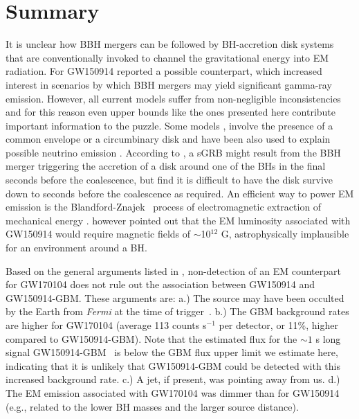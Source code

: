 \documentclass{aastex61}
\begin{document}
\section{Summary}

It is unclear how BBH mergers can be followed by BH-accretion disk systems that are conventionally invoked \citep[e.g.][]{2014ARA&A..52...43B} to channel the gravitational energy into EM radiation. For GW150914 \citet{Connaughton16} reported a possible counterpart, which increased interest in scenarios by which BBH mergers may yield significant gamma-ray emission. However, all current models suffer from non-negligible inconsistencies \citep[e.g.][]{Lyutikov16} and for this reason even upper bounds like the ones presented here contribute important information to the puzzle. Some models \citep{Loeb16,Woosley16}, involve the presence of a common envelope or a circumbinary disk and have been also used to explain possible neutrino emission \citep{Janiuk17,2016PhRvD..93l3011M}. According to \citet{Perna16}, a sGRB might result from the BBH merger triggering the accretion of a disk around one of the BHs in the final seconds before the coalescence, but \citet{Kimura17} find it is difficult to have the disk survive down to seconds before the coalescence as required. An efficient way to power EM emission is the Blandford-Znajek~\citep{Blandford77} process of electromagnetic extraction of mechanical energy \citep{Li16,Veres16}. \citet{Lyutikov16} however pointed out that the EM luminosity associated with GW150914 would require magnetic fields of $\sim$10$^{12}$ G, astrophysically  implausible for an environment around a BH.

Based on the general arguments listed in \citet{Racusin17}, non-detection of an EM counterpart for GW170104 does not rule out the association between GW150914 and GW150914-GBM. These arguments are: a.) The source may have been occulted by the Earth from {\it Fermi} at the time of trigger~\citep[$\sim$18\% of the LIGO map was occulted;][]{Burns17}. b.) The GBM background rates are higher for GW170104 (average 113 counts s$^{-1}$ per detector, or 11\%, higher compared to GW150914-GBM).  Note that the estimated flux for the $\sim 1$ s long signal GW150914-GBM~\citep[$\sim2\times10^{-7}$ erg s$^{-1}$ cm$^{-2}$;][]{Connaughton16} is below the GBM flux upper limit we estimate here, indicating that it is unlikely that GW150914-GBM could be detected with this increased background rate. c.) A jet, if present, was pointing away from us. d.) The EM emission associated with GW170104 was dimmer than for GW150914 (e.g., related to the lower BH masses and the larger source distance).
\end{document}
